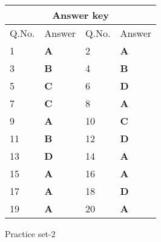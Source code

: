 \begin{table}[H]
	\centering
	\begin{tabular}{|p{1.5cm}|p{1.5cm}||p{1.5cm}|p{1.5cm}|}
		\hline
		\multicolumn{4}{|c|}{\textbf{Answer key}}\\\hline\hline
		\rowcolor{ocrel}Q.No.&Answer&Q.No.&Answer\\\hline
		1&\textbf{A} &2&\textbf{A}\\\hline 
		3&\textbf{B} &4&\textbf{B} \\\hline
		5&\textbf{C} &6&\textbf{D} \\\hline
		7&\textbf{C}&8&\textbf{A}\\\hline
		9&\textbf{A}&10&\textbf{C}\\\hline
		11&\textbf{B}&12&\textbf{D}\\\hline
		13&\textbf{D}&14&\textbf{A}\\\hline
		15&\textbf{A}&16&\textbf{A}\\\hline
		17&\textbf{A} &18&\textbf{D}\\\hline
		19&\textbf{A}&20&\textbf{A}\\\hline
		
	\end{tabular}
\end{table}
\newpage
\begin{abox}
	Practice set-2
\end{abox}
